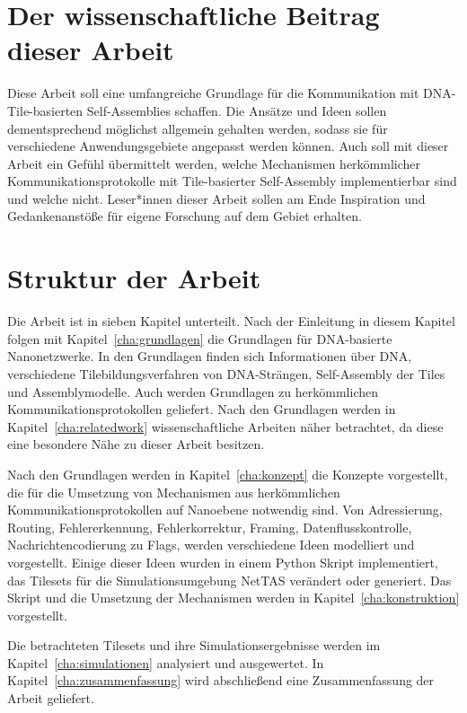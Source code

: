 \section{Der wissenschaftliche Beitrag dieser Arbeit}
Diese Arbeit soll eine umfangreiche Grundlage für die Kommunikation mit DNA-Tile-basierten Self-Assemblies schaffen. Die Ansätze und Ideen sollen dementsprechend möglichst allgemein gehalten werden, sodass sie für verschiedene Anwendungsgebiete angepasst werden können. Auch soll mit dieser Arbeit ein Gefühl übermittelt werden, welche Mechanismen herkömmlicher Kommunikationsprotokolle mit Tile-basierter Self-Assembly implementierbar sind und welche nicht. Leser*innen dieser Arbeit sollen am Ende Inspiration und Gedankenanstöße für eigene Forschung auf dem Gebiet erhalten.

\section{Struktur der Arbeit}
Die Arbeit ist in sieben Kapitel unterteilt. Nach der Einleitung in diesem Kapitel folgen mit Kapitel~\ref{cha:grundlagen} die Grundlagen für DNA-basierte Nanonetzwerke. In den Grundlagen finden sich Informationen über DNA, verschiedene Tilebildungsverfahren von DNA-Strängen, Self-Assembly der Tiles und Assemblymodelle. Auch werden Grundlagen zu herkömmlichen Kommunikationsprotokollen geliefert. Nach den Grundlagen werden in Kapitel~\ref{cha:relatedwork} wissenschaftliche Arbeiten näher betrachtet, da diese eine besondere Nähe zu dieser Arbeit besitzen.

Nach den Grundlagen werden in Kapitel~\ref{cha:konzept} die Konzepte vorgestellt, die für die Umsetzung von Mechanismen aus herkömmlichen Kommunikationsprotokollen auf Nanoebene notwendig sind. Von Adressierung, Routing, Fehlererkennung, Fehlerkorrektur, Framing, Datenflusskontrolle, Nachrichtencodierung zu Flags, werden verschiedene Ideen modelliert und vorgestellt. Einige dieser Ideen wurden in einem Python Skript  implementiert, das Tilesets für die Simulationsumgebung NetTAS verändert oder generiert. Das Skript und die Umsetzung der Mechanismen werden in Kapitel~\ref{cha:konstruktion} vorgestellt.

Die betrachteten Tilesets und ihre Simulationsergebnisse werden im Kapitel~\ref{cha:simulationen} analysiert und ausgewertet. In Kapitel~\ref{cha:zusammenfassung} wird abschließend eine Zusammenfassung der Arbeit geliefert.


